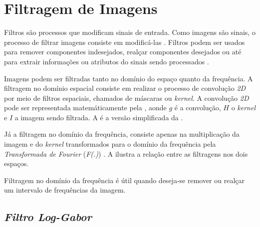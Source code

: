 \section{Filtragem de Imagens} \label{sec:fundamentacao:filtragem}

\par Filtros são processos que modificam sinais de entrada. Como imagens são sinais, o processo de filtrar imagens consiste em modificá-las \cite{gonsalez2006}. Filtros podem ser usados para remover componentes indesejados, realçar componentes desejados ou até para extrair informações ou atributos do sinais sendo processados \cite{loggabor-kovesi}.

\par Imagens podem ser filtradas tanto no domínio do espaço quanto da frequência. A filtragem no domínio espacial consiste em realizar o processo de convolução \textit{2D} por meio de filtros espaciais, chamados de máscaras ou \textit{kernel}\cite{oppenheim2013signals}. A convolução \textit{2D} pode ser representada matemáticamente pela , aonde $g$ é a convolução, $H$ o \textit{kernel} e $I$ a imagem sendo filtrada\cite{gonsalez2006}. A  é a versão simplificada da . 



\par Já a filtragem no domínio da frequência, consiste apenas na multiplicação da imagem e do \textit{kernel} transformados para o domínio da frequência pela \textit{Transformada de Fourier} (\textit{F(.)}) \cite{gonsalez2006}. A  ilustra a relação entre as filtragens nos dois espaços.


\par Filtragem no domínio da frequência é útil quando deseja-se remover ou realçar um intervalo de frequências da imagem.

\subsection{\textit{Filtro Log-Gabor}}\label{sec:fundamentacao:filtragem:loggabor}

